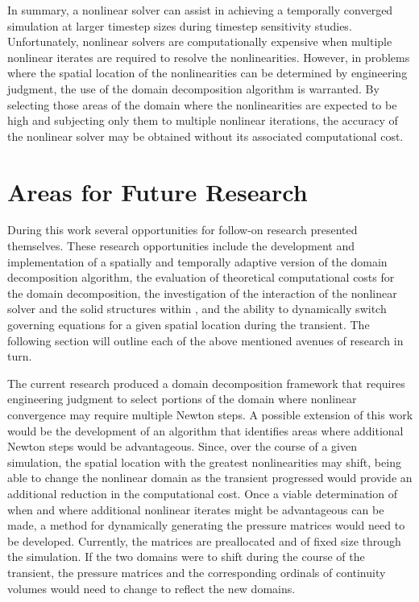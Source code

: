 In summary, a nonlinear solver can assist in achieving a temporally converged simulation at larger timestep sizes during timestep sensitivity studies.
Unfortunately, nonlinear solvers are computationally expensive when multiple nonlinear iterates are required to resolve the nonlinearities.
However, in problems where the spatial location of the nonlinearities can be determined by engineering judgment, the use of the domain decomposition algorithm is warranted.
By selecting those areas of the domain where the nonlinearities are expected to be high and subjecting only them to multiple nonlinear iterations, the accuracy of the nonlinear solver may be obtained without its associated computational cost.

\section{Areas for Future Research}
\label{sect:futureWork}
During this work several opportunities for follow-on research presented themselves.
These research opportunities include the development and implementation of a spatially and temporally adaptive version of the domain decomposition algorithm, the evaluation of theoretical computational costs for the domain decomposition, the investigation of the interaction of the nonlinear solver and the solid structures within \cobra{}, and the ability to dynamically switch governing equations for a given spatial location during the transient.
The following section will outline each of the above mentioned avenues of research in turn.

The current research produced a domain decomposition framework that requires engineering judgment to select portions of the domain where nonlinear convergence may require multiple Newton steps.
A possible extension of this work would be the development of an algorithm that identifies areas where additional Newton steps would be advantageous.
Since, over the course of a given simulation, the spatial location with the greatest nonlinearities may shift, being able to change the nonlinear domain as the transient progressed would provide an additional reduction in the computational cost.
Once a viable determination of when and where additional nonlinear iterates might be advantageous can be made, a method for dynamically generating the pressure matrices would need to be developed.
Currently, the matrices are preallocated and of fixed size through the simulation.
If the two domains were to shift during the course of the transient, the pressure matrices and the corresponding ordinals of continuity volumes would need to change to reflect the new domains.

